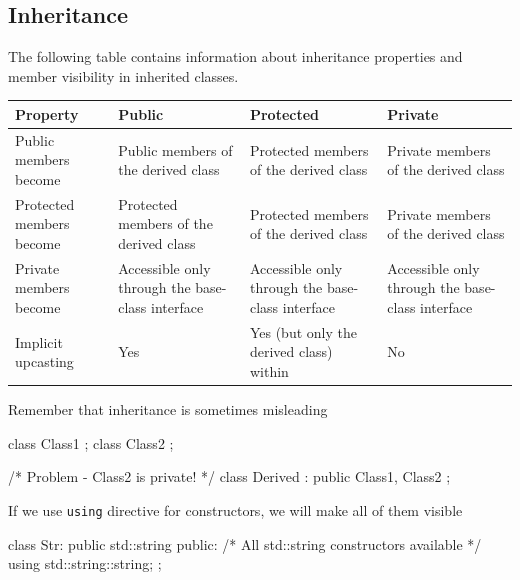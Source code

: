 \documentclass[../main]{subfiles}
\begin{document}
\subsection{Inheritance}
    The following table contains information about inheritance properties and member visibility in inherited classes.
\begin{center}
    \small
    \begin{tabularx}{\textwidth}{|>{\centering\arraybackslash}X|>{\centering\arraybackslash}X|>{\centering\arraybackslash}X|>{\centering\arraybackslash}X|}
        \hline
        \textbf{Property} & \textbf{Public} & \textbf{Protected} & \textbf{Private} \\
        \hline
        Public members become & Public members of the derived class & Protected members of the derived class & Private members of the derived class \\
        \hline
        Protected members become & Protected members of the derived class & Protected members of the derived class & Private members of the derived class \\
        \hline
        Private members become & Accessible only through the base-class interface & Accessible only through the base-class interface & Accessible only through the base-class interface \\
        \hline
        Implicit upcasting & Yes & Yes (but only the derived class) within & No \\
        \hline
    \end{tabularx}
\end{center}

    Remember that inheritance is sometimes misleading
\begin{Code}
    class Class1 {};
    class Class2 {};
    
    /* Problem - Class2 is private! */
    class Derived : public Class1, Class2 {};
\end{Code}

    If we use \texttt{using} directive for constructors, we will make all of them visible
\begin{Code}
    class Str: public std::string
    {
    public:
        /* All std::string constructors available */
        using std::string::string;
    };
\end{Code}
\end{document}
